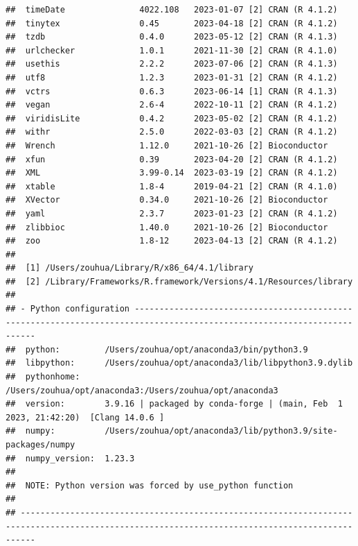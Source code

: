 \documentclass[
]{book}
\begin{document}
\begin{verbatim}
##  timeDate               4022.108   2023-01-07 [2] CRAN (R 4.1.2)
##  tinytex                0.45       2023-04-18 [2] CRAN (R 4.1.2)
##  tzdb                   0.4.0      2023-05-12 [2] CRAN (R 4.1.3)
##  urlchecker             1.0.1      2021-11-30 [2] CRAN (R 4.1.0)
##  usethis                2.2.2      2023-07-06 [2] CRAN (R 4.1.3)
##  utf8                   1.2.3      2023-01-31 [2] CRAN (R 4.1.2)
##  vctrs                  0.6.3      2023-06-14 [1] CRAN (R 4.1.3)
##  vegan                  2.6-4      2022-10-11 [2] CRAN (R 4.1.2)
##  viridisLite            0.4.2      2023-05-02 [2] CRAN (R 4.1.2)
##  withr                  2.5.0      2022-03-03 [2] CRAN (R 4.1.2)
##  Wrench                 1.12.0     2021-10-26 [2] Bioconductor
##  xfun                   0.39       2023-04-20 [2] CRAN (R 4.1.2)
##  XML                    3.99-0.14  2023-03-19 [2] CRAN (R 4.1.2)
##  xtable                 1.8-4      2019-04-21 [2] CRAN (R 4.1.0)
##  XVector                0.34.0     2021-10-26 [2] Bioconductor
##  yaml                   2.3.7      2023-01-23 [2] CRAN (R 4.1.2)
##  zlibbioc               1.40.0     2021-10-26 [2] Bioconductor
##  zoo                    1.8-12     2023-04-13 [2] CRAN (R 4.1.2)
## 
##  [1] /Users/zouhua/Library/R/x86_64/4.1/library
##  [2] /Library/Frameworks/R.framework/Versions/4.1/Resources/library
## 
## - Python configuration ------------------------------------------------------------------------------------------------------------------------
##  python:         /Users/zouhua/opt/anaconda3/bin/python3.9
##  libpython:      /Users/zouhua/opt/anaconda3/lib/libpython3.9.dylib
##  pythonhome:     /Users/zouhua/opt/anaconda3:/Users/zouhua/opt/anaconda3
##  version:        3.9.16 | packaged by conda-forge | (main, Feb  1 2023, 21:42:20)  [Clang 14.0.6 ]
##  numpy:          /Users/zouhua/opt/anaconda3/lib/python3.9/site-packages/numpy
##  numpy_version:  1.23.3
##  
##  NOTE: Python version was forced by use_python function
## 
## -----------------------------------------------------------------------------------------------------------------------------------------------
\end{verbatim}

  
\end{document}
